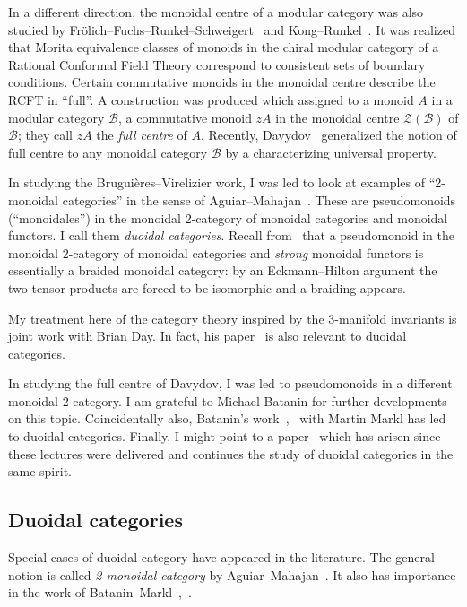 \documentclass[a4paper,12pt]{article}
\theoremstyle{definition}
\theoremstyle{fact}
\theoremstyle{genquest}
\theoremstyle{step}
\newcommand{\catB}{\mathcal{B}}
\newcommand{\catZ}{\mathcal{Z}}%
\begin{document}
In a different direction, the monoidal centre of a modular category was also studied by Fr\"olich--Fuchs--Runkel--Schweigert~\cite{FFRS2006} and Kong--Runkel~\cite{KongRunkel}. 
It was realized that Morita equivalence classes of monoids in the chiral modular category of a Rational Conformal Field Theory correspond to consistent sets of boundary conditions. 
Certain commutative monoids in the monoidal centre describe the RCFT in ``full''.   
A construction was produced which assigned to a monoid $A$ in a modular category $\catB$, a commutative monoid $zA$ in the monoidal centre $\catZ(\catB)$ of $\catB$; 
they call $zA$ the \emph{full centre} of $A$. 
Recently, Davydov~\cite{Davydov2010} generalized the notion of full centre to any monoidal category $\catB$ by a characterizing universal property.
 
In studying the Brugui\`eres--Virelizier work, I was led to look at examples of ``2-monoidal categories'' 
in the sense of Aguiar--Mahajan~\cite{AguiarMahajan}. 
These are pseudomonoids (``monoidales'') in the monoidal 2-category of monoidal categories and monoidal functors.   
I call them \emph{duoidal categories}.  
Recall from~\cite{BTC} that a pseudomonoid in the monoidal 2-category of monoidal categories and \emph{strong} monoidal functors is essentially a braided monoidal category: 
by an Eckmann--Hilton argument the two tensor products are forced to be isomorphic and a braiding appears.

My treatment here of the category theory inspired by the 3-manifold invariants is joint work with Brian Day.
In fact, his paper~\cite{DayMid4} is also relevant to duoidal categories. 
 
In studying the full centre of Davydov, I was led to pseudomonoids in a different monoidal 2-category.  
I am grateful to Michael Batanin for further developments on  this topic.   
Coincidentally also, Batanin's work~\cite{Batanin2011a},~\cite{BatMarkl} with Martin Markl has led to duoidal categories. 
Finally, I might point to a paper~\cite{BookSt} which has arisen since these lectures were delivered 
and continues the study of duoidal categories in the same spirit.  

 
\subsection{Duoidal categories}
 
Special cases of duoidal category have appeared in the literature. 
The general notion is called  \emph{2-monoidal category} by Aguiar--Mahajan~\cite{AguiarMahajan}. 
It also has importance in the work of Batanin--Markl~\cite{Batanin2011a},~\cite{BatMarkl}. 
 
\end{document}
